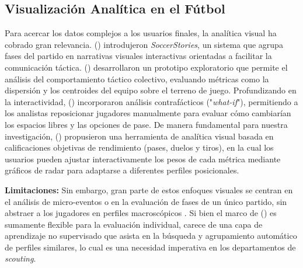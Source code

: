 \documentclass[conference]{IEEEtran}
\begin{document}
\subsection{Visualización Analítica en el Fútbol}
Para acercar los datos complejos a los usuarios finales, la analítica visual ha cobrado gran relevancia. \citeauthor{perin2013soccerstories} (\citeyear{perin2013soccerstories}) introdujeron \textit{SoccerStories}, un sistema que agrupa fases del partido en narrativas visuales interactivas orientadas a facilitar la comunicación táctica. \citeauthor{benitosantos2018data} (\citeyear{benitosantos2018data}) desarrollaron un prototipo exploratorio que permite el análisis del comportamiento táctico colectivo, evaluando métricas como la dispersión y los centroides del equipo sobre el terreno de juego. Profundizando en la interactividad, \citeauthor{stein2019where} (\citeyear{stein2019where}) incorporaron análisis contrafácticos ("\textit{what-if}"), permitiendo a los analistas reposicionar jugadores manualmente para evaluar cómo cambiarían los espacios libres y las opciones de pase. De manera fundamental para nuestra investigación, \citeauthor{evers2024visual} (\citeyear{evers2024visual}) propusieron una herramienta de analítica visual basada en calificaciones objetivas de rendimiento (pases, duelos y tiros), en la cual los usuarios pueden ajustar interactivamente los pesos de cada métrica mediante gráficos de radar para adaptarse a diferentes perfiles posicionales.

\textbf{Limitaciones:} Sin embargo, gran parte de estos enfoques visuales se centran en el análisis de micro-eventos o en la evaluación de fases de un único partido, sin abstraer a los jugadores en perfiles macroscópicos \citep{perin2013soccerstories, stein2019where, benitosantos2018data}. Si bien el marco de \citeauthor{evers2024visual} (\citeyear{evers2024visual}) es sumamente flexible para la evaluación individual, carece de una capa de aprendizaje no supervisado que asista en la búsqueda y agrupamiento automático de perfiles similares, lo cual es una necesidad imperativa en los departamentos de \textit{scouting}.
\end{document}
